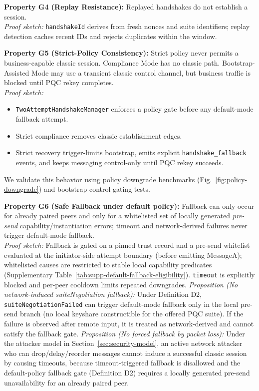 \documentclass[10pt,journal,compsoc]{IEEEtran}
\providecommand{\tightlist}{%
  \setlength{\itemsep}{0pt}\setlength{\parskip}{0pt}}
\begin{document}
\textbf{Property G4 (Replay Resistance):} Replayed handshakes do not
establish a session.\\
\emph{Proof sketch:} \texttt{handshakeId} derives from fresh nonces and
suite identifiers; replay detection caches recent IDs and rejects
duplicates within the window.

\textbf{Property G5 (Strict-Policy Consistency):} Strict policy never
permits a business-capable classic session. Compliance Mode has no
classic path. Bootstrap-Assisted Mode may use a transient classic
control channel, but business traffic is blocked until PQC rekey
completes.\\
\emph{Proof sketch:}
\begin{itemize}\tightlist
\item \texttt{TwoAttempt\allowbreak Handshake\allowbreak Manager} enforces a
policy gate before any default-mode fallback attempt.
\item Strict compliance removes classic establishment edges.
\item Strict recovery trigger-limits bootstrap, emits explicit
\texttt{handshake\_fallback} events, and keeps messaging control-only
until PQC rekey succeeds.
\end{itemize}
We validate this behavior using policy downgrade benchmarks
(Fig.~\ref{fig:policy-downgrade}) and bootstrap control-gating tests.

\textbf{Property G6 (Safe Fallback under default policy):} Fallback can
only occur for already paired peers and only for a whitelisted set of
locally generated \emph{pre-send} capability/instantiation errors;
timeout and network-derived failures never trigger default-mode
fallback.\\
\emph{Proof sketch:} Fallback is gated on a pinned trust record and a
pre-send whitelist evaluated at the initiator-side attempt boundary
(before emitting MessageA); whitelisted causes are restricted to stable local capability
predicates (Supplementary Table~\ref{tab:supp-default-fallback-eligibility}). \texttt{timeout}
is explicitly blocked and per-peer cooldown limits repeated downgrades.
\emph{Proposition (No network-induced suiteNegotiation fallback):} Under
Definition D2, \texttt{suiteNegotiationFailed} can trigger
default-mode fallback only in the local pre-send branch (no local
keyshare constructible for the offered PQC suite). If the failure is
observed after remote input, it is treated as network-derived and
cannot satisfy the fallback gate.
\emph{Proposition (No forced fallback by packet loss):} Under the attacker model in Section~\ref{sec:security-model}, an active network attacker who can drop/delay/reorder messages cannot induce a successful classic session by causing timeouts, because timeout-triggered fallback is disallowed and the default-policy fallback gate (Definition D2) requires a locally generated pre-send unavailability for an already paired peer.
\end{document}
